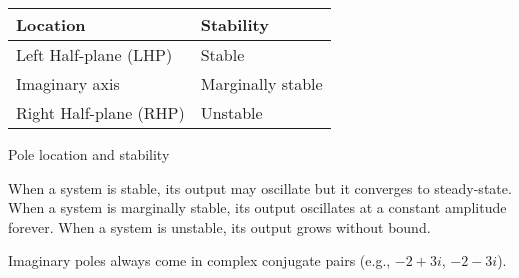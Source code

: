 \begin{booktable}
  \begin{tabular}{|ll|}
    \hline
    \rowcolor{headingbg}
    \textbf{Location} & \textbf{Stability} \\
    \hline
    Left Half-plane (LHP) & Stable \\
    Imaginary axis & Marginally stable \\
    Right Half-plane (RHP) & Unstable \\
    \hline
  \end{tabular}

  \caption{Pole location and stability}
\end{booktable}

When a \gls{system} is stable, its output may oscillate but it converges to
steady-state. When a \gls{system} is marginally stable, its output oscillates at
a constant amplitude forever. When a \gls{system} is unstable, its output grows
without bound.
\begin{remark}
  Imaginary poles always come in complex conjugate pairs (e.g., $-2 + 3i$,
  $-2 - 3i$).
\end{remark}
